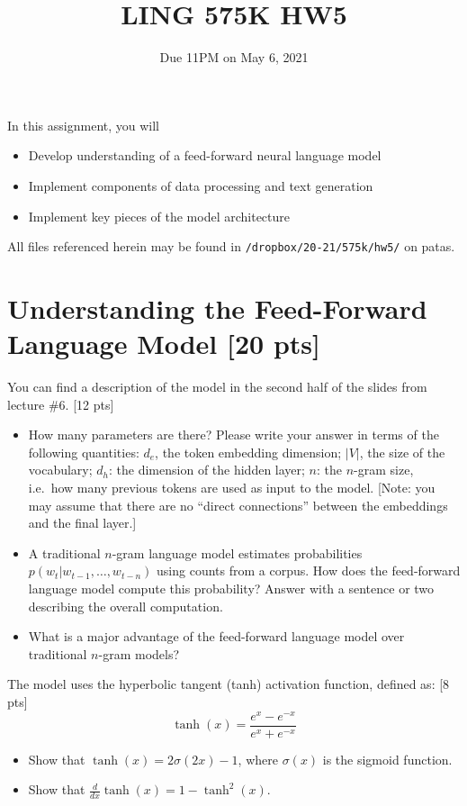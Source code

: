 \documentclass[11pt]{article}
\begin{document}
\title{LING 575K HW5}
\date{\vspace{-0.2in}Due 11PM on May 6, 2021}
\maketitle


\noindent In this assignment, you will 
\begin{itemize}
  \item Develop understanding of a feed-forward neural language model
  \item Implement components of data processing and text generation
  \item Implement key pieces of the model architecture
\end{itemize}
All files referenced herein may be found in \texttt{/dropbox/20-21/575k/hw5/} on patas.


\section{Understanding the Feed-Forward Language Model [20 pts]}

  You can find a description of the model in the second half of the slides from lecture \#6. \hfill [12 pts]
\begin{itemize}
  \item How many parameters are there?  Please write your answer in terms of the following quantities: $d_e$, the token embedding dimension; $|V|$, the size of the vocabulary; $d_h$: the dimension of the hidden layer; $n$: the $n$-gram size, i.e.\ how many previous tokens are used as input to the model.  [Note: you may assume that there are no ``direct connections'' between the embeddings and the final layer.]
  \item A traditional $n$-gram language model estimates probabilities $p(w_t | w_{t-1} , \dots , w_{t-n})$ using counts from a corpus.  How does the feed-forward language model compute this probability?  Answer with a sentence or two describing the overall computation.
  \item What is a major advantage of the feed-forward language model over traditional $n$-gram models?
\end{itemize}


\vspace{2em}
 The model uses the hyperbolic tangent (tanh) activation function, defined as: \hfill [8 pts]
\[ \tanh(x) = \frac{e^x - e^{-x}}{e^x + e^{-x}} \]
\begin{itemize}
  \item Show that $\tanh(x) = 2\sigma(2x) - 1$, where $\sigma(x)$ is the sigmoid function.
  \item Show that $\frac{d}{dx}\tanh(x) = 1 - \tanh^2(x)$.
\end{itemize}
\end{document}
